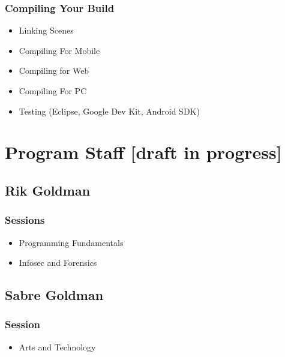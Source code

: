 \documentclass[letterpaper,10pt,english]{sphinxmanual}
\begin{document}
\subsection{Compiling Your Build}
\label{gamedev:compiling-your-build}\begin{itemize}
\item {} 
Linking Scenes

\item {} 
Compiling For Mobile

\item {} 
Compiling for Web

\item {} 
Compiling For PC

\item {} 
Testing (Eclipse, Google Dev Kit, Android SDK)

\end{itemize}


\chapter{Program Staff {[}draft in progress{]}}
\label{faculty:program-staff-draft-in-progress}\label{faculty::doc}

\section{Rik Goldman}
\label{faculty:rik-goldman}

\subsection{Sessions}
\label{faculty:sessions}\begin{itemize}
\item {} 
Programming Fundamentals

\item {} 
Infosec and Forensics

\end{itemize}


\section{Sabre Goldman}
\label{faculty:sabre-goldman}

\subsection{Session}
\label{faculty:session}\begin{itemize}
\item {} 
Arts and Technology

\end{itemize}
\end{document}
